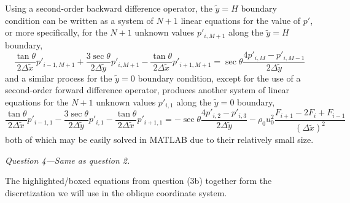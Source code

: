 \documentclass[11pt]{article}
\begin{document}
Using a second-order backward difference operator, the $\tilde{y}=H$ boundary condition can be written as a system of $N+1$ linear equations for the value of $p'$, or more specifically, for the $N+1$ unknown values $p'_{i,M+1}$ along the $\tilde{y}=H$ boundary,
\begin{equation}
  \frac{\tan\theta}{2\Delta\tilde{x}} p'_{i-1,M+1}
  + \frac{3\sec\theta}{2\Delta\tilde{y}} p'_{i,M+1}
  - \frac{\tan\theta}{2\Delta\tilde{x}} p'_{i+1,M+1}
  = \sec\theta \frac{4p'_{i,M} - p'_{i,M-1}}{2\Delta\tilde{y}}
\end{equation}
and a similar process for the $\tilde{y}=0$ boundary condition, except for the use of a second-order forward difference operator, produces another system of linear equations for the $N+1$ unknown values $p'_{i,1}$ along the $\tilde{y}=0$ boundary,
\begin{equation}
  \frac{\tan\theta}{2\Delta\tilde{x}} p'_{i-1,1}
- \frac{3\sec\theta}{2\Delta\tilde{y}} p'_{i,1}
- \frac{\tan\theta}{2\Delta\tilde{x}} p'_{i+1,1}
= - \sec\theta \frac{4p'_{i,2} - p'_{i,3}}{2\Delta\tilde{y}}
- \rho_0 u_0^2 \frac{F_{i+1} - 2F_i + F_{i-1}}{(\Delta\tilde{x})^2}
\end{equation}
both of which may be easily solved in MATLAB due to their relatively small size.

\begin{tcolorbox}
  \textit{Question 4---Same as question 2.}
\end{tcolorbox}
The highlighted/boxed equations from question (3b) together form the discretization we will use in the oblique coordinate system.
\end{document}
